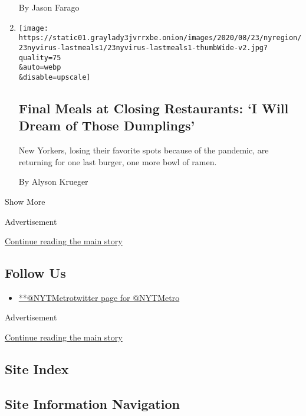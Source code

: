 \begin{enumerate}
  By Jason Farago
\item
  \href{/2020/08/19/nyregion/coronavirus-nyc-restaurant-closures.html}{}

  \texttt{[image: https://static01.graylady3jvrrxbe.onion/images/2020/08/23/nyregion/23nyvirus-lastmeals1/23nyvirus-lastmeals1-thumbWide-v2.jpg?quality=75\\\&auto=webp\\\&disable=upscale]}

  \hypertarget{final-meals-at-closing-restaurants-i-will-dream-of-those-dumplings}{%
  \subsection{Final Meals at Closing Restaurants: `I Will Dream of Those
  Dumplings'}\label{final-meals-at-closing-restaurants-i-will-dream-of-those-dumplings}}

  New Yorkers, losing their favorite spots because of the pandemic, are
  returning for one last burger, one more bowl of ramen.

  By Alyson Krueger
\end{enumerate}

Show More

Advertisement

\protect\hyperlink{after-mid2}{Continue reading the main story}

\hypertarget{follow-us}{%
\subsection{Follow Us}\label{follow-us}}

\begin{itemize}
\tightlist
\item
  \href{https://twitter.com/NYTMetro}{**@NYTMetrotwitter page for
  @NYTMetro}
\end{itemize}

Advertisement

\protect\hyperlink{after-mktg}{Continue reading the main story}

\hypertarget{site-index}{%
\subsection{Site Index}\label{site-index}}

\hypertarget{site-information-navigation}{%
\subsection{Site Information
Navigation}\label{site-information-navigation}}

